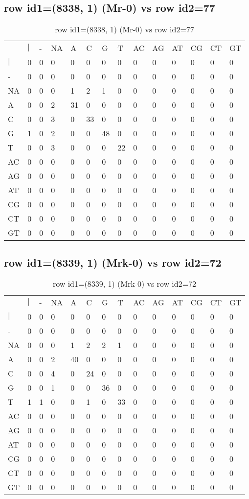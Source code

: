 \subsection{row id1=(8338, 1) (Mr-0) vs row id2=77}
\begin{center}
\begin{longtable}{|l|l|l|l|l|l|l|l|l|l|l|l|l|l|}
\caption{row id1=(8338, 1) (Mr-0) vs row id2=77} \label{table_dm538}\\
\hline
\\
\hline
&$|$&-&NA&A&C&G&T&AC&AG&AT&CG&CT&GT\\
$|$&0&0&0&0&0&0&0&0&0&0&0&0&0\\
-&0&0&0&0&0&0&0&0&0&0&0&0&0\\
NA&0&0&0&1&2&1&0&0&0&0&0&0&0\\
A&0&0&2&31&0&0&0&0&0&0&0&0&0\\
C&0&0&3&0&33&0&0&0&0&0&0&0&0\\
G&1&0&2&0&0&48&0&0&0&0&0&0&0\\
T&0&0&3&0&0&0&22&0&0&0&0&0&0\\
AC&0&0&0&0&0&0&0&0&0&0&0&0&0\\
AG&0&0&0&0&0&0&0&0&0&0&0&0&0\\
AT&0&0&0&0&0&0&0&0&0&0&0&0&0\\
CG&0&0&0&0&0&0&0&0&0&0&0&0&0\\
CT&0&0&0&0&0&0&0&0&0&0&0&0&0\\
GT&0&0&0&0&0&0&0&0&0&0&0&0&0\\
\hline
\end{longtable}
\end{center}

\subsection{row id1=(8339, 1) (Mrk-0) vs row id2=72}
\begin{center}
\begin{longtable}{|l|l|l|l|l|l|l|l|l|l|l|l|l|l|}
\caption{row id1=(8339, 1) (Mrk-0) vs row id2=72} \label{table_dm540}\\
\hline
\\
\hline
&$|$&-&NA&A&C&G&T&AC&AG&AT&CG&CT&GT\\
$|$&0&0&0&0&0&0&0&0&0&0&0&0&0\\
-&0&0&0&0&0&0&0&0&0&0&0&0&0\\
NA&0&0&0&1&2&2&1&0&0&0&0&0&0\\
A&0&0&2&40&0&0&0&0&0&0&0&0&0\\
C&0&0&4&0&24&0&0&0&0&0&0&0&0\\
G&0&0&1&0&0&36&0&0&0&0&0&0&0\\
T&1&1&0&0&1&0&33&0&0&0&0&0&0\\
AC&0&0&0&0&0&0&0&0&0&0&0&0&0\\
AG&0&0&0&0&0&0&0&0&0&0&0&0&0\\
AT&0&0&0&0&0&0&0&0&0&0&0&0&0\\
CG&0&0&0&0&0&0&0&0&0&0&0&0&0\\
CT&0&0&0&0&0&0&0&0&0&0&0&0&0\\
GT&0&0&0&0&0&0&0&0&0&0&0&0&0\\
\hline
\end{longtable}
\end{center}

